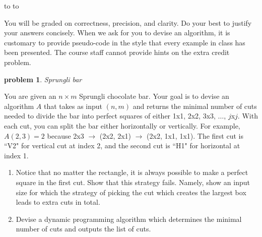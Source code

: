 \documentclass[11pt]{article}
\newcommand{\handout}{
   \renewcommand{\thepage}{H\hnumber-\arabic{page}}%
   \noindent%
   \begin{center}%
      \vbox{%
    \hbox to \columnwidth {\sc{\course} --- abhi shelat \hfill}%
    \vspace{-2mm}%
    \hbox to \columnwidth {\sc due \MakeLowercase{\duedate} \duelocation\hfill {\Huge\color{mdb}H\hnumber.\yourname}}%
      }
   \end{center}
   \vspace*{2mm}
}
\newtheorem{problem}{\sc\color{cit}problem}
\begin{document}
\handout

    You will be graded on correctness, precision, and clarity.  Do your best to justify your answers concisely.  When we ask for you to devise an algorithm, it is customary to provide pseudo-code in the style that every example in class has been presented.  The course staff cannot provide hints on the extra credit problem.
    


\begin{problem}{Sprungli bar}\end{problem}
You are given an $n\times m$ Sprungli chocolate bar.  Your goal is to devise an algorithm $A$ that
takes as input $(n,m)$ and returns the minimal number of cuts needed to divide the bar 
into perfect squares of either 1x1, 2x2, 3x3, $\ldots$, $j$x$j$.  With each cut, you can split the bar
either horizontally or vertically. For example,  $A(2,3)=2$ because 2x3 $\rightarrow$ (2x2, 2x1) $\rightarrow$ (2x2, 1x1, 1x1). The first cut is ``V2" for vertical cut at index 2, and the second cut is ``H1" for horizontal at index 1.

\begin{enumerate}
        \item Notice that no matter the rectangle, it is always possible to make a perfect square in the first cut.
        Show that this strategy fails.  Namely, show an input size for which the strategy of picking the cut which creates the 
        largest box leads to extra cuts in total.
        \item Devise a dynamic programming algorithm which determines the minimal number of cuts and outputs the list of cuts.
\end{enumerate}

\hfill
   
\end{document}
